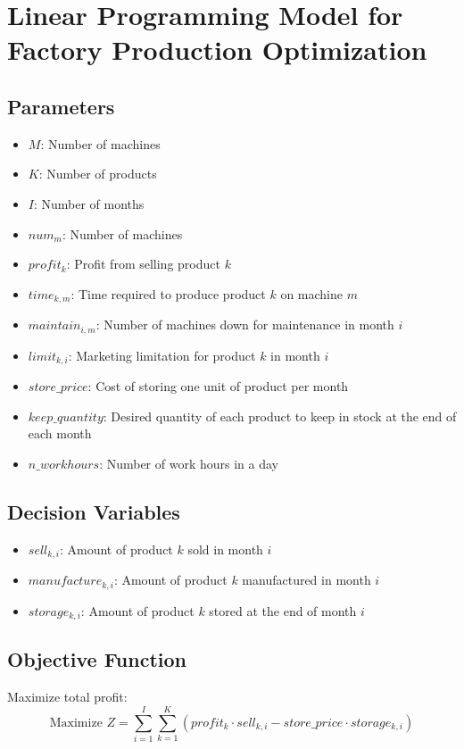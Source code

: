 \documentclass{article}
\begin{document}
\section*{Linear Programming Model for Factory Production Optimization}

\subsection*{Parameters}
\begin{itemize}
    \item $M$: Number of machines
    \item $K$: Number of products
    \item $I$: Number of months
    \item $num_{m}$: Number of machines
    \item $profit_{k}$: Profit from selling product $k$
    \item $time_{k, m}$: Time required to produce product $k$ on machine $m$
    \item $maintain_{i, m}$: Number of machines down for maintenance in month $i$
    \item $limit_{k, i}$: Marketing limitation for product $k$ in month $i$
    \item $store\_price$: Cost of storing one unit of product per month
    \item $keep\_quantity$: Desired quantity of each product to keep in stock at the end of each month
    \item $n\_workhours$: Number of work hours in a day
\end{itemize}

\subsection*{Decision Variables}
\begin{itemize}
    \item $sell_{k, i}$: Amount of product $k$ sold in month $i$
    \item $manufacture_{k, i}$: Amount of product $k$ manufactured in month $i$
    \item $storage_{k, i}$: Amount of product $k$ stored at the end of month $i$
\end{itemize}

\subsection*{Objective Function}
Maximize total profit:
\[
\text{Maximize } Z = \sum_{i=1}^{I} \sum_{k=1}^{K} (profit_{k} \cdot sell_{k, i} - store\_price \cdot storage_{k, i})
\]
\end{document}
